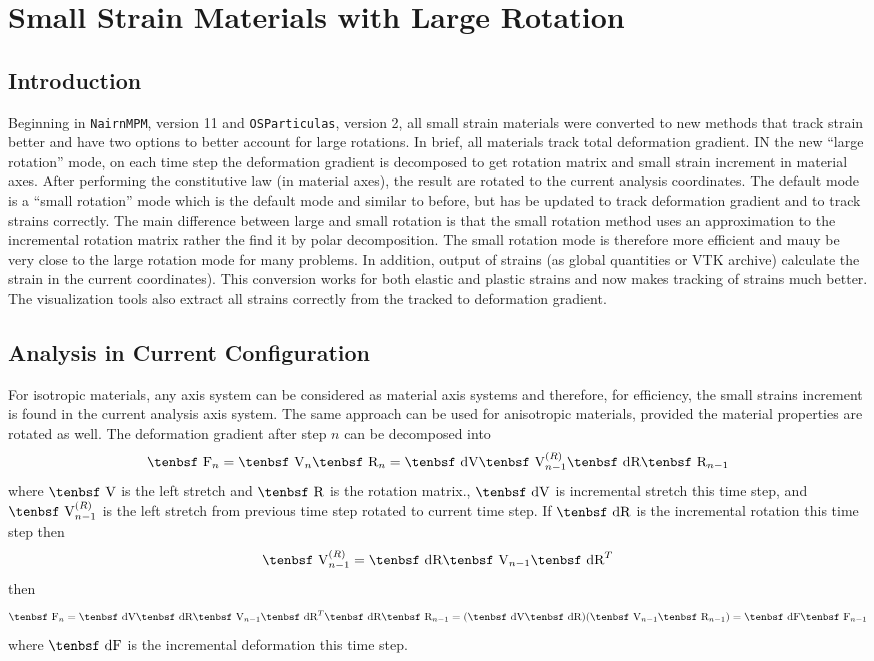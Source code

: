 \documentclass[11pt]{book}
\def\F{\hbox{\tenbsf F}}
\def\dF{\hbox{\tenbsf dF}}
\def\R{\hbox{\tenbsf R}}
\def\dR{\hbox{\tenbsf dR}}
\def\V{\hbox{\tenbsf V}}
\def\dV{\hbox{\tenbsf dV}}
\begin{document}
\chapter{Small Strain Materials with Large Rotation}

\section{Introduction}

Beginning in {\tt NairnMPM}, version 11 and {\tt OSParticulas}, version 2, all small strain materials were converted to new methods that track strain better and have two options to better account for large rotations. In brief, all materials track total deformation gradient. IN the new ``large rotation'' mode, on each time step the deformation gradient is decomposed to get rotation matrix and small strain increment in material axes. After performing the constitutive law (in material axes), the result are rotated to the current analysis coordinates. The default mode is a ``small rotation'' mode which is the default mode and similar to before, but has be updated to track deformation gradient and to track strains correctly. The main difference between large and small rotation is that the small rotation method uses an approximation to the incremental rotation matrix rather the find it by polar decomposition. The small rotation mode is therefore more efficient and mauy be very close to the large rotation mode for many problems. In addition, output of strains (as global quantities or VTK archive) calculate the strain in the current coordinates). This conversion works for both elastic and plastic strains and now makes tracking of strains much better. The visualization tools also extract all strains correctly from the tracked to deformation gradient.

\section{Analysis in Current Configuration}

For isotropic materials, any axis system can be considered as material axis systems and therefore, for efficiency, the small strains increment is found in the current analysis axis system. The same approach can be used for anisotropic materials, provided the material properties are rotated as well. The deformation gradient after step $n$ can be decomposed into
\begin{equation}
   \F_n = \V_n\R_n = \dV \V_{n-1}^{(R)} \dR \R_{n-1}
\end{equation}
where $\V$ is the left stretch and $\R$ is the rotation matrix., $\dV$ is incremental stretch this time step, and $\V_{n-1}^{(R)} $ is the left stretch from previous time step rotated to current time step. If $\dR$ is the incremental rotation this time step then
\begin{equation}
    \V_{n-1}^{(R)} =  \dR \V_{n-1} \dR^T
\end{equation}
then
\begin{equation}
   \F_n =  \dV \dR \V_{n-1} \dR^T \dR \R_{n-1} = (\dV\dR)(\V_{n-1}  \R_{n-1}) = \dF \F_{n-1}
\end{equation}
where $\dF$ is the incremental deformation this time step.
\end{document}
